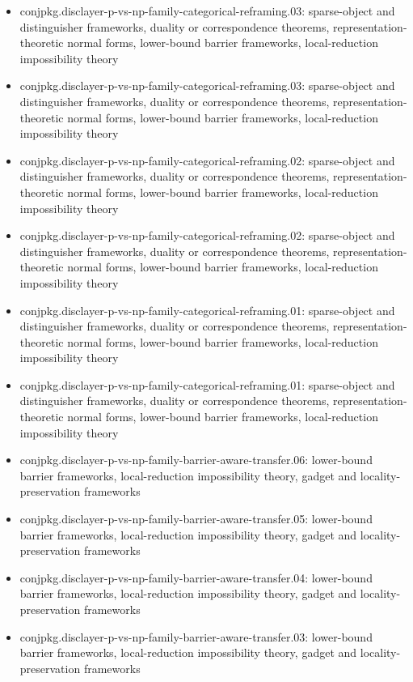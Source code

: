 \documentclass[11pt]{article}
\begin{document}
\begin{itemize}
\item conjpkg.disclayer-p-vs-np-family-categorical-reframing.03: sparse-object and distinguisher frameworks, duality or correspondence theorems, representation-theoretic normal forms, lower-bound barrier frameworks, local-reduction impossibility theory
\item conjpkg.disclayer-p-vs-np-family-categorical-reframing.03: sparse-object and distinguisher frameworks, duality or correspondence theorems, representation-theoretic normal forms, lower-bound barrier frameworks, local-reduction impossibility theory
\item conjpkg.disclayer-p-vs-np-family-categorical-reframing.02: sparse-object and distinguisher frameworks, duality or correspondence theorems, representation-theoretic normal forms, lower-bound barrier frameworks, local-reduction impossibility theory
\item conjpkg.disclayer-p-vs-np-family-categorical-reframing.02: sparse-object and distinguisher frameworks, duality or correspondence theorems, representation-theoretic normal forms, lower-bound barrier frameworks, local-reduction impossibility theory
\item conjpkg.disclayer-p-vs-np-family-categorical-reframing.01: sparse-object and distinguisher frameworks, duality or correspondence theorems, representation-theoretic normal forms, lower-bound barrier frameworks, local-reduction impossibility theory
\item conjpkg.disclayer-p-vs-np-family-categorical-reframing.01: sparse-object and distinguisher frameworks, duality or correspondence theorems, representation-theoretic normal forms, lower-bound barrier frameworks, local-reduction impossibility theory
\item conjpkg.disclayer-p-vs-np-family-barrier-aware-transfer.06: lower-bound barrier frameworks, local-reduction impossibility theory, gadget and locality-preservation frameworks
\item conjpkg.disclayer-p-vs-np-family-barrier-aware-transfer.05: lower-bound barrier frameworks, local-reduction impossibility theory, gadget and locality-preservation frameworks
\item conjpkg.disclayer-p-vs-np-family-barrier-aware-transfer.04: lower-bound barrier frameworks, local-reduction impossibility theory, gadget and locality-preservation frameworks
\item conjpkg.disclayer-p-vs-np-family-barrier-aware-transfer.03: lower-bound barrier frameworks, local-reduction impossibility theory, gadget and locality-preservation frameworks

\end{itemize}
\end{document}
